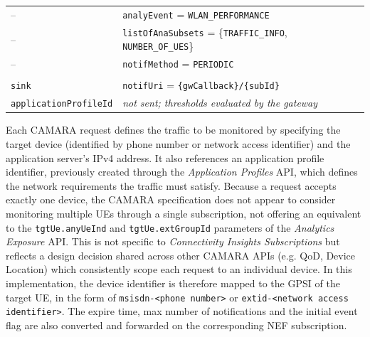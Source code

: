 \begin{table}[htbp]
\begin{tabularx}{\textwidth}{@{}
        >{\RaggedRight\arraybackslash}X
        >{\RaggedRight\arraybackslash}X@{}}
        -- & \texttt{analyEvent} = \texttt{WLAN\_PERFORMANCE} \\
        -- & \texttt{listOfAnaSubsets} = \{\texttt{TRAFFIC\allowbreak\_INFO}, \texttt{NUMBER\allowbreak\_OF\allowbreak\_UES}\}\\
        -- & \texttt{notifMethod} = \texttt{PERIODIC} \\
        \midrule
        \multicolumn{2}{@{}l}{\textit{Replaced or not forwarded}} \\
        \texttt{sink}                          & \texttt{notifUri} = \texttt{\{gwCallback\}/\{subId\}} \\
        \texttt{applicationProfileId}          & \textit{not sent; thresholds evaluated by the gateway} \\
        \bottomrule
    \end{tabularx}
\end{table}

Each CAMARA request defines the traffic to be monitored by specifying the target device (identified by phone number or network access identifier) and the application server’s IPv4 address. It also references an application profile identifier, previously created through the \textit{Application Profiles} \acs{API}, which defines the network requirements the traffic must satisfy. Because a request accepts exactly one device, the CAMARA specification does not appear to consider monitoring multiple \acsp{UE} through a single subscription, not offering an equivalent to the \texttt{tgtUe.anyUeInd} and \texttt{tgtUe.extGroupId} parameters of the \textit{Analytics Exposure} \acs{API}. This is not specific to \textit{Connectivity Insights Subscriptions} but reflects a design decision shared across other CAMARA \acsp{API} (e.g. \acs{QoD}, Device Location) which consistently scope each request to an individual device. In this implementation, the device identifier is therefore mapped to the \acs{GPSI} of the target \acs{UE}, in the form of \texttt{msisdn-<phone number>} or \texttt{extid-<network access identifier>}. The expire time, max number of notifications and the initial event flag are also converted and forwarded on the corresponding \acs{NEF} subscription.

